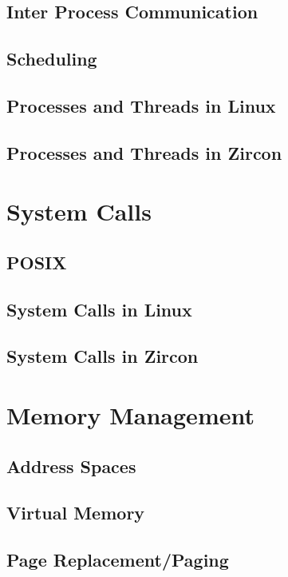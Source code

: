 \subsection{Inter Process Communication}
\subsection{Scheduling}
\subsection{Processes and Threads in Linux}
\subsection{Processes and Threads in Zircon}


\section{System Calls} %
\subsection{POSIX}
\subsection{System Calls in Linux}
\subsection{System Calls in Zircon}


\section{Memory Management} %
\subsection{Address Spaces}
\subsection{Virtual Memory}
\subsection{Page Replacement/Paging}
